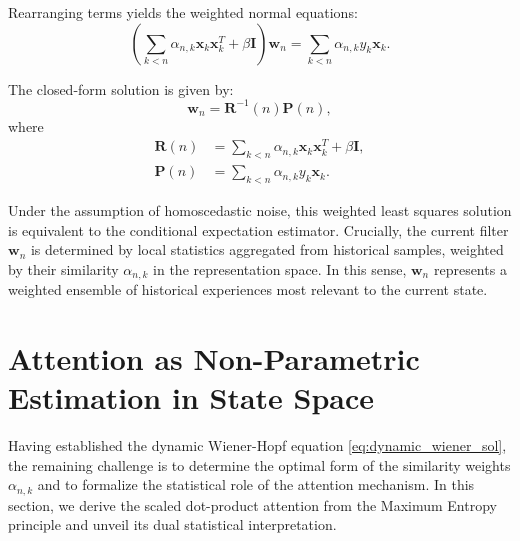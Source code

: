 \documentclass[conference]{IEEEtran}
\begin{document}
Rearranging terms yields the weighted normal equations:
\begin{equation}
\left( \sum_{k<n} \alpha_{n,k} \mathbf{x}_k \mathbf{x}_k^T + \beta \mathbf{I} \right) \mathbf{w}_n = \sum_{k<n} \alpha_{n,k} y_k \mathbf{x}_k.
\label{eq:dynamic_wiener_sol}
\end{equation}

The closed-form solution is given by:
\begin{equation}
\mathbf{w}_n = \mathbf{R}^{-1}(n) \mathbf{P}(n),
\end{equation}
where
\begin{align}
\mathbf{R}(n) &= \sum_{k<n} \alpha_{n,k} \mathbf{x}_k \mathbf{x}_k^T + \beta \mathbf{I}, \\
\mathbf{P}(n) &= \sum_{k<n} \alpha_{n,k} y_k \mathbf{x}_k.
\end{align}

Under the assumption of homoscedastic noise, this weighted least squares solution is equivalent to the conditional expectation estimator. Crucially, the current filter $\mathbf{w}_n$ is determined by local statistics aggregated from historical samples, weighted by their similarity $\alpha_{n,k}$ in the representation space. In this sense, $\mathbf{w}_n$ represents a weighted ensemble of historical experiences most relevant to the current state.

\section{Attention as Non-Parametric Estimation in State Space}
\label{sec:attention_theory}

Having established the dynamic Wiener-Hopf equation \eqref{eq:dynamic_wiener_sol}, the remaining challenge is to determine the optimal form of the similarity weights $\alpha_{n,k}$ and to formalize the statistical role of the attention mechanism. In this section, we derive the scaled dot-product attention from the Maximum Entropy principle and unveil its dual statistical interpretation.
\end{document}
